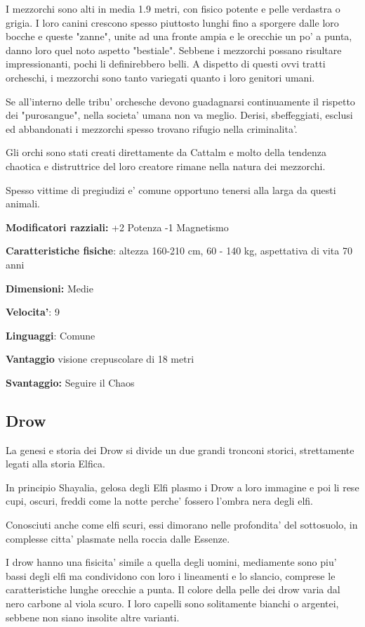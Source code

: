 \documentclass[a4paper,11pt,twoside,openany]{book}
\begin{document}
I mezzorchi sono alti in media 1.9 metri, con fisico potente e pelle verdastra o grigia. I loro canini crescono spesso piuttosto lunghi fino a sporgere dalle loro bocche e queste "zanne", unite ad una fronte ampia e le orecchie un po' a punta, danno loro quel noto aspetto "bestiale". Sebbene i mezzorchi possano risultare impressionanti, pochi li definirebbero belli. A dispetto di questi ovvi tratti orcheschi, i mezzorchi sono tanto variegati quanto i loro genitori umani.

Se all'interno delle tribu' orchesche devono guadagnarsi continuamente il rispetto dei "purosangue", nella societa' umana non va meglio. Derisi, sbeffeggiati, esclusi ed abbandonati i mezzorchi spesso trovano rifugio nella criminalita'.

Gli orchi sono stati creati direttamente da Cattalm e molto della tendenza chaotica e distruttrice del loro creatore rimane nella natura dei mezzorchi.

Spesso vittime di pregiudizi e' comune opportuno tenersi alla larga da questi animali.

\textbf{Modificatori razziali:} +2 Potenza -1 Magnetismo

\textbf{Caratteristiche fisiche}: altezza 160-210 cm, 60 - 140 kg,
aspettativa di vita 70 anni

\textbf{Dimensioni:} Medie

\textbf{Velocita'}: 9

\textbf{Linguaggi}: Comune

\textbf{Vantaggio} visione crepuscolare di 18 metri

\textbf{Svantaggio:} Seguire il Chaos

\subsection{Drow}

\label{drow}

La genesi e storia dei Drow si divide un due grandi tronconi storici, strettamente legati alla storia Elfica.

In principio Shayalia, gelosa degli Elfi plasmo i Drow a loro immagine e poi li rese cupi, oscuri, freddi come la notte perche' fossero l'ombra nera degli elfi.

Conosciuti anche come elfi scuri, essi dimorano nelle profondita' del sottosuolo, in complesse citta' plasmate nella roccia dalle Essenze.

I drow hanno una fisicita' simile a quella degli uomini, mediamente sono piu' bassi degli elfi ma condividono con loro i lineamenti e lo slancio, comprese le caratteristiche lunghe orecchie a punta. Il colore della pelle dei drow varia dal nero carbone al viola scuro. I loro capelli sono solitamente bianchi o argentei, sebbene non siano insolite altre varianti.
\end{document}

